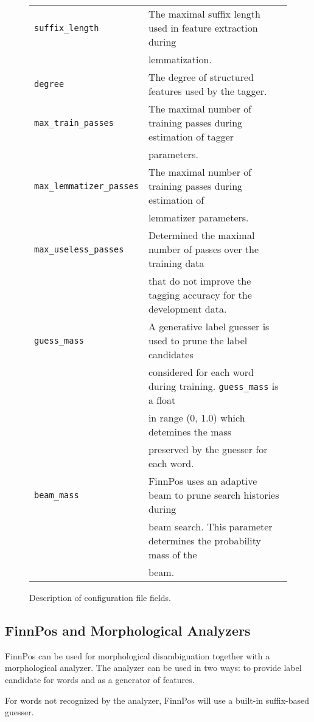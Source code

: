 \documentclass{llncs}
\begin{document}
\begin{figure}
\begin{tabular}{ll}
{\tt suffix\_length} & The maximal suffix length used in feature extraction during\\
                     & lemmatization.\\
{\tt degree} & The degree of structured features used by the tagger. \\
{\tt max\_train\_passes} & The maximal number of training passes during estimation of tagger\\
                         & parameters.\\
{\tt max\_lemmatizer\_passes} & The maximal number of training passes during estimation of\\
                              & lemmatizer parameters.\\
{\tt max\_useless\_passes} & Determined the maximal number of passes over the training data\\
                           & that do not improve the tagging accuracy for the development data.\\
{\tt guess\_mass} & A generative label guesser is used to prune the label candidates\\
                  & considered for each word during training. {\tt guess\_mass} is a float\\
                  & in range (0, 1.0) which detemines the mass \\
                  &  preserved by the guesser for each word.\\
{\tt beam\_mass} & FinnPos uses an adaptive beam to prune search histories during\\
                 & beam search. This parameter determines the probability mass of the\\
                 & beam.
\end{tabular}
\caption{Description of configuration file fields.}
\end{figure}

\subsection{FinnPos and Morphological Analyzers}

FinnPos can be used for morphological disambiguation together with a
morphological analyzer. The analyzer can be used in two ways: to
provide label candidate for words and as a generator of features.

For words not recognized by the analyzer, FinnPos will use a built-in
suffix-based guesser.
\end{document}
